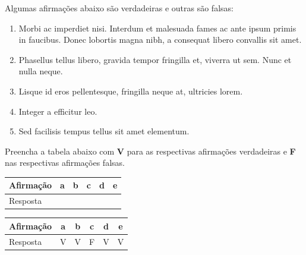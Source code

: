 \documentclass[12pt,a4paper]{article}
\begin{document}
\begin{question}
    Algumas afirmações abaixo são verdadeiras e outras são falsas:
    \begin{enumerate}[label=(\alph*)]
        \item Morbi ac imperdiet nisi. Interdum et malesuada fames ac ante ipsum primis in faucibus. Donec lobortis magna nibh, a consequat libero convallis sit amet.
        \item Phasellus tellus libero, gravida tempor fringilla et, viverra ut sem. Nunc et nulla neque. 
        \item Lisque id eros pellentesque, fringilla neque at, ultricies lorem.
        \item Integer a efficitur leo. 
        \item Sed facilisis tempus tellus sit amet elementum. 
    \end{enumerate}
    Preencha a tabela abaixo com \textbf{V} para as respectivas  afirmações verdadeiras e \textbf{F} nas respectivas afirmações falsas.
    \begin{table}[h]
        \centering
        \begin{tabular}{l|c|c|c|c|c|}
            \toprule
            Afirmação & a & b & c & d & e \\
            \midrule
            Resposta &  &  &  &  &  \\
            \bottomrule
        \end{tabular}
    \end{table}
\end{question}
\begin{answer}[print=true]
    \begin{table}[h]
        \centering
        \begin{tabular}{l|c|c|c|c|c|}
            \toprule
            Afirmação & a & b & c & d & e \\
            \midrule
            Resposta & V & V & F & V & V \\
            \bottomrule
        \end{tabular}
    \end{table}
\end{answer}
\end{document}
